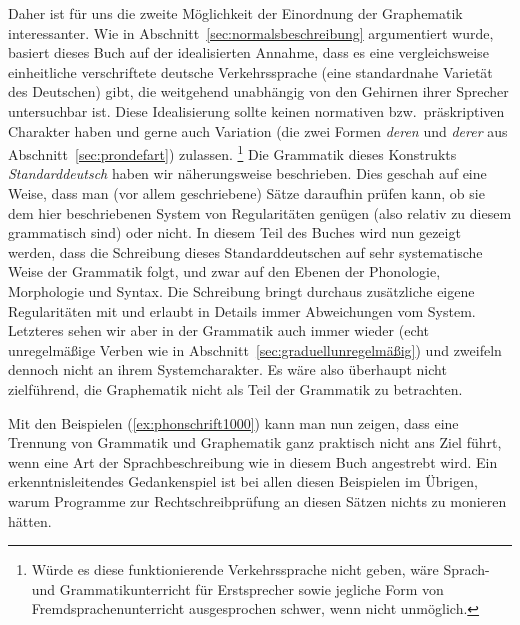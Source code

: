 Daher ist für uns die zweite Möglichkeit der Einordnung der Graphematik interessanter.
Wie in Abschnitt~\ref{sec:normalsbeschreibung} argumentiert wurde, basiert dieses Buch auf der idealisierten Annahme, dass es eine vergleichsweise einheitliche verschriftete deutsche Verkehrssprache (eine standardnahe Varietät des Deutschen) gibt, die weitgehend unabhängig von den Gehirnen ihrer Sprecher untersuchbar ist.
Diese Idealisierung sollte keinen normativen bzw.\ präskriptiven Charakter haben und gerne auch Variation (\zB die zwei Formen \textit{deren} und \textit{derer} aus Abschnitt~\ref{sec:prondefart}) zulassen.%
\footnote{Würde es diese funktionierende Verkehrssprache nicht geben, wäre Sprach- und Grammatikunterricht für Erstsprecher sowie jegliche Form von Fremdsprachenunterricht ausgesprochen schwer, wenn nicht unmöglich.}
Die Grammatik dieses Konstrukts \textit{Standarddeutsch} haben wir näherungsweise beschrieben.
Dies geschah auf eine Weise, dass man (vor allem geschriebene) Sätze daraufhin prüfen kann, ob sie dem hier beschriebenen System von Regularitäten genügen (also relativ zu diesem grammatisch sind) oder nicht.
In diesem Teil des Buches wird nun gezeigt werden, dass die Schreibung dieses Standarddeutschen auf sehr systematische Weise der Grammatik folgt, und zwar auf den Ebenen der Phonologie, Morphologie und Syntax.
Die Schreibung bringt durchaus zusätzliche eigene Regularitäten mit und erlaubt in Details immer Abweichungen vom System.
Letzteres sehen wir aber in der Grammatik auch immer wieder (\zB echt unregelmäßige Verben wie in Abschnitt~\ref{sec:graduellunregelmäßig}) und zweifeln dennoch nicht an ihrem Systemcharakter.
Es wäre also überhaupt nicht zielführend, die Graphematik nicht als Teil der Grammatik zu betrachten.

Mit den Beispielen (\ref{ex:phonschrift1000}) kann man nun zeigen, dass eine Trennung von Grammatik und Graphematik ganz praktisch nicht ans Ziel führt, wenn eine Art der Sprachbeschreibung wie in diesem Buch angestrebt wird.
Ein erkenntnisleitendes Gedankenspiel ist bei allen diesen Beispielen im Übrigen, warum Programme zur Rechtschreibprüfung an diesen Sätzen nichts zu monieren hätten.

\begin{exe}
  \ex\label{ex:phonschrift1000} 
  \begin{xlist}
  \end{xlist}
\end{exe}

